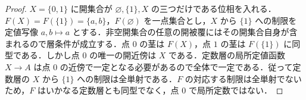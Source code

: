 \begin{proof}
$X=\{0,1\}$ に開集合が $\varnothing,\{1\},X$ の三つだけである位相を入れる．$F(X)=F(\{1\})=\{a,b\}$，$F(\varnothing)$ を一点集合とし，$X$ から $\{1\}$ への制限を定値写像 $a,b\mapsto a$ とする．非空開集合の任意の開被覆にはその開集合自身が含まれるので層条件が成立する．点 $0$ の茎は $F(X)$，点 $1$ の茎は $F(\{1\})$ に同型である．しかし点 $0$ の唯一の開近傍は $X$ である．定数層の局所定値函数 $X\to A$ は点 $0$ の近傍で一定となる必要があるので全体で一定である．従って定数層の $X$ から $\{1\}$ への制限は全単射である．$F$ の対応する制限は全単射でないため，$F$ はいかなる定数層とも同型でなく，点 $0$ で局所定数ではない．
\end{proof}
